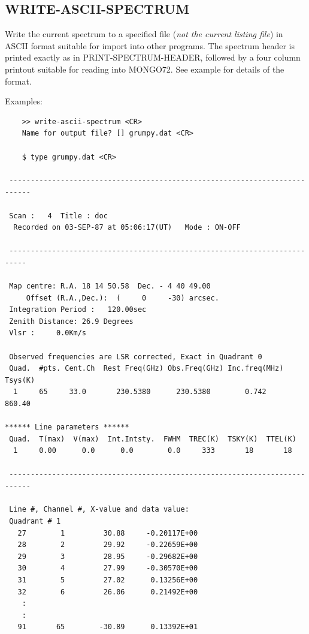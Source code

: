 \documentclass[11pt,twoside]{report}
\begin{document}
\subsection{WRITE-ASCII-SPECTRUM} 

Write the current spectrum to a specified file ({\em not the current listing
file}) in ASCII format suitable for import into other programs. The spectrum
header is printed exactly as in PRINT-SPECTRUM-HEADER, followed by a four
column printout suitable for reading into MONGO72. See example for details of
the format.

Examples:
\begin{verbatim}
    >> write-ascii-spectrum <CR>
    Name for output file? [] grumpy.dat <CR>

    $ type grumpy.dat <CR>

 ---------------------------------------------------------------------------

 Scan :   4  Title : doc
  Recorded on 03-SEP-87 at 05:06:17(UT)   Mode : ON-OFF

 --------------------------------------------------------------------------

 Map centre: R.A. 18 14 50.58  Dec. - 4 40 49.00
     Offset (R.A.,Dec.):  (     0     -30) arcsec.
 Integration Period :   120.00sec
 Zenith Distance: 26.9 Degrees
 Vlsr :     0.0Km/s

 Observed frequencies are LSR corrected, Exact in Quadrant 0
 Quad.  #pts. Cent.Ch  Rest Freq(GHz) Obs.Freq(GHz) Inc.freq(MHz) Tsys(K)
  1     65     33.0       230.5380      230.5380        0.742    860.40

****** Line parameters ******
 Quad.  T(max)  V(max)  Int.Intsty.  FWHM  TREC(K)  TSKY(K)  TTEL(K)
  1     0.00      0.0      0.0        0.0     333       18       18

 ---------------------------------------------------------------------------

 Line #, Channel #, X-value and data value:
 Quadrant # 1
   27        1         30.88     -0.20117E+00
   28        2         29.92     -0.22659E+00
   29        3         28.95     -0.29682E+00
   30        4         27.99     -0.30570E+00
   31        5         27.02      0.13256E+00
   32        6         26.06      0.21492E+00
    :
    :
   91       65        -30.89      0.13392E+01

\end{verbatim}
\end{document}

